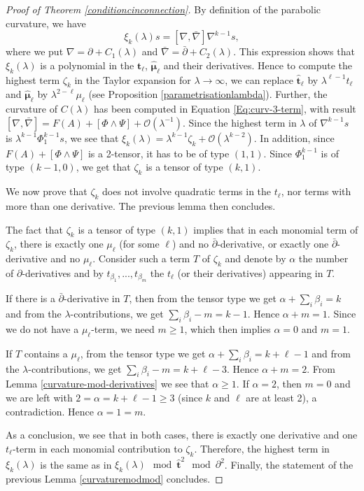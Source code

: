 \documentclass[11pt]{amsart}
\numberwithin{thm}{section} %
\numberwithin{equation}{section} %
\numberwithin{figure}{section} %
\renewcommand*{\l}{\lambda}
\begin{document}
\begin{proof}[Proof of Theorem \ref{conditioncinconnection}]
By definition of the parabolic curvature, we have 
\begin{equation}\label{Eq:xik-2}
\xi_k(\l)s=[\nabla,\bar\nabla]\nabla^{k-1}s,
\end{equation} 
where we put $\nabla=\partial+C_1(\l)$ and $\bar\nabla=\bar\partial+C_2(\l)$. This expression shows that $\xi_k(\l)$ is a polynomial in the $\bm\hat{t}_\ell$, $\bm\hat{\mu}_\ell$ and their derivatives. Hence to compute the highest term $\zeta_k$ in the Taylor expansion for $\l\to\infty$, we can replace $\bm\hat{t}_\ell$ by $\l^{\ell-1}t_\ell$ and $\bm\hat{\mu}_\ell$ by $\l^{2-\ell}\mu_\ell$ (see Proposition \ref{parametrisationlambda}).
Further, the curvature of $C(\l)$ has been computed in Equation \eqref{Eq:curv-3-term}, with result $[\nabla,\bar\nabla]=F(A)+[\Phi\wedge\Psi]+\mathcal{O}(\l^{-1})$. 
Since the highest term in $\l$ of $\nabla^{k-1}s$ is $\l^{k-1}\Phi_1^{k-1}s$, we see that $\xi_k(\l)=\l^{k-1}\zeta_k+\mathcal{O}(\l^{k-2})$.
In addition, since $F(A)+[\Phi\wedge\Psi]$ is a 2-tensor, it has to be of type $(1,1)$. Since $\Phi_1^{k-1}$ is of type $(k-1,0)$, we get that $\zeta_k$ is a tensor of type $(k,1)$.

We now prove that $\zeta_k$ does not involve quadratic terms in the $t_\ell$, nor terms with more than one derivative. The previous lemma then concludes.

The fact that $\zeta_k$ is a tensor of type $(k,1)$ implies that in each monomial term of $\zeta_k$, there is exactly one $\mu_\ell$ (for some $\ell$) and no $\bar\partial$-derivative, or exactly one $\bar\partial$-derivative and no $\mu_\ell$. Consider such a term $T$ of $\zeta_k$ and denote by $\alpha$ the number of $\partial$-derivatives and by $t_{\beta_1},...,t_{\beta_m}$ the $t_\ell$ (or their derivatives) appearing in $T$. 

If there is a $\bar\partial$-derivative in $T$, then from the tensor type we get $\alpha+\sum_i \beta_i=k$ and from the $\l$-contributions, we get $\sum_i \beta_i-m = k-1$. Hence $\alpha+m=1$. Since we do not have a $\mu_\ell$-term, we need $m\geq 1$, which then implies $\alpha=0$ and $m=1$. 

If $T$ contains a $\mu_\ell$, from the tensor type we get $\alpha+\sum_i\beta_i=k+\ell-1$ and from the $\l$-contributions, we get $\sum_i \beta_i-m=k+\ell-3$. Hence $\alpha+m=2$. From Lemma \ref{curvature-mod-derivatives} we see that $\alpha\geq 1$. If $\alpha=2$, then $m=0$ and we are left with $2=\alpha = k+\ell-1\geq 3$ (since $k$ and $\ell$ are at least 2), a contradiction.
Hence $\alpha=1=m$. 

As a conclusion, we see that in both cases, there is exactly one derivative and one $t_\ell$-term in each monomial contribution to $\zeta_k$.
Therefore, the highest term in $\xi_k(\l)$ is the same as in $\xi_k(\l) \mod \bm\hat{t}^2 \mod \partial^2$. Finally, the statement of the previous Lemma \ref{curvaturemodmod} concludes.
\end{proof}
\end{document}
